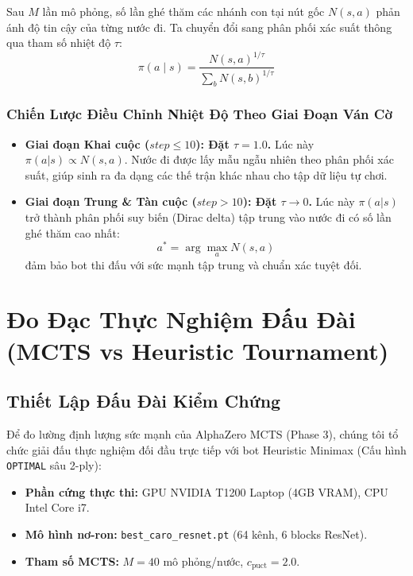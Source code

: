 \documentclass[12pt,a4paper,oneside]{report}
\begin{document}
Sau $M$ lần mô phỏng, số lần ghé thăm các nhánh con tại nút gốc $N(s, a)$ phản ánh độ tin cậy của từng nước đi. Ta chuyển đổi sang phân phối xác suất thông qua tham số nhiệt độ $\tau$:
\begin{equation}
    \pi(a \mid s) = \frac{N(s, a)^{1/\tau}}{\sum_b N(s, b)^{1/\tau}}
\end{equation}

\subsection*{Chiến Lược Điều Chỉnh Nhiệt Độ Theo Giai Đoạn Ván Cờ}
\begin{itemize}
    \item \textbf{Giai đoạn Khai cuộc ($step \le 10$): Đặt $\tau = 1.0$.}
    Lúc này $\pi(a|s) \propto N(s, a)$. Nước đi được lấy mẫu ngẫu nhiên theo phân phối xác suất, giúp sinh ra đa dạng các thế trận khác nhau cho tập dữ liệu tự chơi.
    \item \textbf{Giai đoạn Trung \& Tàn cuộc ($step > 10$): Đặt $\tau \to 0$.}
    Lúc này $\pi(a|s)$ trở thành phân phối suy biến (Dirac delta) tập trung vào nước đi có số lần ghé thăm cao nhất:
    \begin{equation}
        a^* = \arg\max_{a} N(s, a)
    \end{equation}
    đảm bảo bot thi đấu với sức mạnh tập trung và chuẩn xác tuyệt đối.
\end{itemize}

\chapter{Đo Đạc Thực Nghiệm Đấu Đài (MCTS vs Heuristic Tournament)}

\section{Thiết Lập Đấu Đài Kiểm Chứng}

Để đo lường định lượng sức mạnh của AlphaZero MCTS (Phase 3), chúng tôi tổ chức giải đấu thực nghiệm đối đầu trực tiếp với bot Heuristic Minimax (Cấu hình \texttt{OPTIMAL} sâu 2-ply):
\begin{itemize}
    \item \textbf{Phần cứng thực thi:} GPU NVIDIA T1200 Laptop (4GB VRAM), CPU Intel Core i7.
    \item \textbf{Mô hình nơ-ron:} \texttt{best\_caro\_resnet.pt} (64 kênh, 6 blocks ResNet).
    \item \textbf{Tham số MCTS:} $M = 40$ mô phỏng/nước, $c_{\text{puct}} = 2.0$.
\end{itemize}
\end{document}
